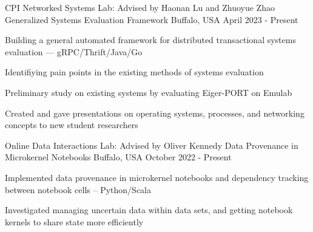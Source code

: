 

\begin{cventries}


  \cventry
    {CPI Networked Systems Lab: Advised by Haonan Lu and Zhuoyue Zhao} %
    {Generalized Systems Evaluation Framework} %
    {Buffalo, USA} %
    {April 2023 - Present} %
    {
      \begin{cvitems} %
        \item Building a general automated framework for distributed transactional systems evaluation --- gRPC/Thrift/Java/Go
        \item Identifiying pain points in the existing methods of systems evaluation
        \item Preliminary study on existing systems by evaluating Eiger-PORT on Emulab
        \item Created and gave presentations on operating systems, processes, and networking concepts to new student researchers
      \end{cvitems}
    }


  \cventry
    {Online Data Interactions Lab: Advised by Oliver Kennedy} %
    {Data Provenance in Microkernel Notebooks} %
    {Buffalo, USA} %
    {October 2022 - Present} %
    {
      \begin{cvitems} %
        \item Implemented data provenance in microkernel notebooks and dependency tracking between notebook cells -- Python/Scala
        \item Investigated managing uncertain data within data sets, and getting notebook kernels to share state more efficiently
      \end{cvitems}
    }

\end{cventries}
